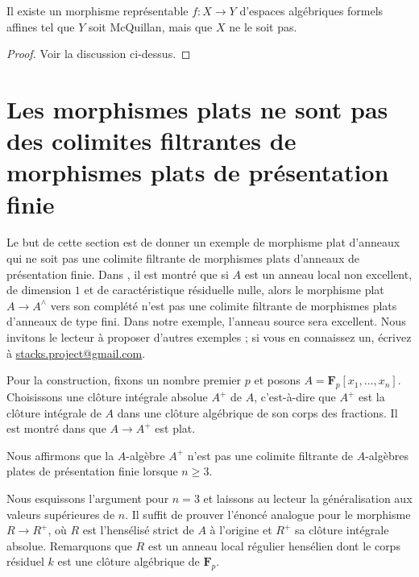 \begin{lemma}
\label{lemma-representable-morphism-affine-formal-not-mcquillan-top}
Il existe un morphisme représentable $f : X \to Y$ d'espaces
algébriques formels affines tel que $Y$ soit McQuillan, mais que $X$
ne le soit pas.
\end{lemma}

\begin{proof}
Voir la discussion ci-dessus.
\end{proof}









\section[Morphismes plats et colimites de présentation finie]{Les morphismes plats ne sont pas des colimites filtrantes de morphismes plats de présentation finie}
\label{section-flat-not-colimit-flat-finitely-presented}

\noindent
Le but de cette section est de donner un exemple de morphisme plat d'anneaux
qui ne soit pas une colimite filtrante de morphismes plats d'anneaux de
présentation finie. Dans \cite{gabber-nonexcellent}, il est montré que si
$A$ est un anneau local non excellent, de dimension $1$ et de caractéristique
résiduelle nulle, alors le morphisme plat $A \to A^\wedge$ vers son complété
n'est pas une colimite filtrante de morphismes plats d'anneaux de type fini.
Dans notre exemple, l'anneau source sera excellent. Nous invitons le lecteur
à proposer d'autres exemples ;
si vous en connaissez un, écrivez à
\href{mailto:stacks.project@gmail.com}{stacks.project@gmail.com}.

\medskip\noindent
Pour la construction, fixons un nombre premier $p$ et posons
$A = \mathbf{F}_p[x_1, \ldots, x_n]$.
Choisissons une clôture intégrale absolue $A^+$ de $A$, c'est-à-dire que $A^+$ est la
clôture intégrale de $A$ dans une clôture algébrique de son corps des fractions.
Il est montré dans \cite[\S 6.7]{HHBigCM} que $A \to A^+$ est plat.

\medskip\noindent
Nous affirmons que la $A$-algèbre $A^+$ n'est pas une colimite filtrante de
$A$-algèbres plates de présentation finie lorsque $n \geq 3$.

\medskip\noindent
Nous esquissons l'argument pour $n = 3$ et laissons au lecteur la généralisation
aux valeurs supérieures de $n$. Il suffit de prouver l'énoncé analogue pour
le morphisme $R \to R^+$, où $R$ est l'hensélisé strict de $A$ à l'origine
et $R^+$ sa clôture intégrale absolue. Remarquons que $R$
est un anneau local régulier hensélien dont le corps résiduel $k$
est une clôture algébrique de $\mathbf{F}_p$.


